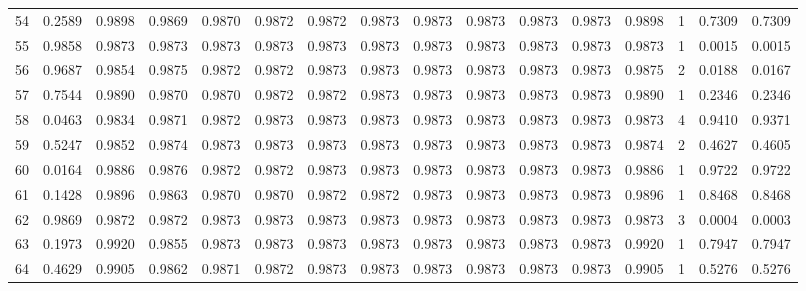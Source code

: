 \begin{tabular}{lrrrrrrrrrrrrrrr}
54  &      0.2589 &  0.9898 &  0.9869 &  0.9870 &  0.9872 &  0.9872 &  0.9873 &  0.9873 &  0.9873 &  0.9873 &   0.9873 &     0.9898 &      1 &                    0.7309 &                     0.7309 \\
55  &      0.9858 &  0.9873 &  0.9873 &  0.9873 &  0.9873 &  0.9873 &  0.9873 &  0.9873 &  0.9873 &  0.9873 &   0.9873 &     0.9873 &      1 &                    0.0015 &                     0.0015 \\
56  &      0.9687 &  0.9854 &  0.9875 &  0.9872 &  0.9872 &  0.9873 &  0.9873 &  0.9873 &  0.9873 &  0.9873 &   0.9873 &     0.9875 &      2 &                    0.0188 &                     0.0167 \\
57  &      0.7544 &  0.9890 &  0.9870 &  0.9870 &  0.9872 &  0.9872 &  0.9873 &  0.9873 &  0.9873 &  0.9873 &   0.9873 &     0.9890 &      1 &                    0.2346 &                     0.2346 \\
58  &      0.0463 &  0.9834 &  0.9871 &  0.9872 &  0.9873 &  0.9873 &  0.9873 &  0.9873 &  0.9873 &  0.9873 &   0.9873 &     0.9873 &      4 &                    0.9410 &                     0.9371 \\
59  &      0.5247 &  0.9852 &  0.9874 &  0.9873 &  0.9873 &  0.9873 &  0.9873 &  0.9873 &  0.9873 &  0.9873 &   0.9873 &     0.9874 &      2 &                    0.4627 &                     0.4605 \\
60  &      0.0164 &  0.9886 &  0.9876 &  0.9872 &  0.9872 &  0.9873 &  0.9873 &  0.9873 &  0.9873 &  0.9873 &   0.9873 &     0.9886 &      1 &                    0.9722 &                     0.9722 \\
61  &      0.1428 &  0.9896 &  0.9863 &  0.9870 &  0.9870 &  0.9872 &  0.9872 &  0.9873 &  0.9873 &  0.9873 &   0.9873 &     0.9896 &      1 &                    0.8468 &                     0.8468 \\
62  &      0.9869 &  0.9872 &  0.9872 &  0.9873 &  0.9873 &  0.9873 &  0.9873 &  0.9873 &  0.9873 &  0.9873 &   0.9873 &     0.9873 &      3 &                    0.0004 &                     0.0003 \\
63  &      0.1973 &  0.9920 &  0.9855 &  0.9873 &  0.9873 &  0.9873 &  0.9873 &  0.9873 &  0.9873 &  0.9873 &   0.9873 &     0.9920 &      1 &                    0.7947 &                     0.7947 \\
64  &      0.4629 &  0.9905 &  0.9862 &  0.9871 &  0.9872 &  0.9873 &  0.9873 &  0.9873 &  0.9873 &  0.9873 &   0.9873 &     0.9905 &      1 &                    0.5276 &                     0.5276 \\

\end{tabular}
